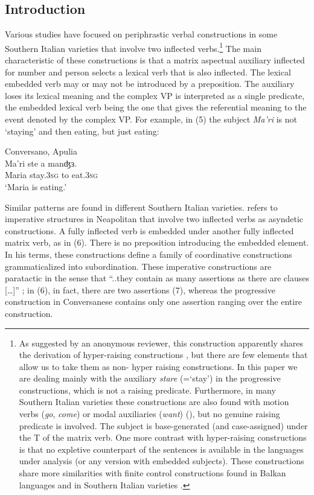 \documentclass[output=paper]{langsci/langscibook}
\begin{document}
\subsection{Introduction}%

Various studies have focused on periphrastic verbal constructions in some Southern Italian varieties that involve two inflected verbs.\footnote{As suggested by an anonymous reviewer, this construction apparently shares the derivation of hyper-raising constructions \citep{Harford1985,Martins2005,Nunes2008,Zeller2006}, but there are few elements that allow us to take them as non- hyper raising constructions. In this paper we are dealing mainly with the auxiliary \textit{stare} (=‘stay’) in the progressive constructions, which is not a raising predicate. Furthermore, in many Southern Italian varieties these constructions are also found with motion verbs (\textit{go}, \textit{come}) or modal auxiliaries (\textit{want}) (\citealt{Manzini2005,Di2015,Manzini2017,CardinalettiND}), but no genuine raising predicate is involved. The subject is base-generated (and case-assigned) under the T of the matrix verb. One more contrast with hyper-raising constructions is that no expletive counterpart of the sentences is available in the languages under analysis (or any version with embedded subjects). These constructions share more similarities with finite control constructions found in Balkan languages \citep{Landau2004,Landau2013,Manzini2000} and in Southern Italian varieties \citep{Manzini2005,Ledgeway2015}.}  The main characteristic of these constructions is that a matrix aspectual auxiliary inflected for number and person selects a lexical verb that is also inflected. The lexical embedded verb may or may not be introduced by a preposition. The auxiliary loses its lexical meaning and the complex VP is interpreted as a single predicate, the embedded lexical verb being the one that gives the referential meaning to the event denoted by the complex VP. For example, in (5) the subject \textit{Ma'ri} is not ‘staying’ and then eating, but just eating:

\ea%
         Conversano, Apulia\label{ex:lorusso:5}\\
    \gll Ma'ri  ste     a   manʤɜ.\\
         Maria  stay.\textsc{3sg}  to  eat.\textsc{3sg}\\
    \glt ‘Maria is eating.’
    \z          

Similar patterns are found in different Southern Italian varieties. \citet{Ledgeway1997} refers to imperative structures in Neapolitan that involve two inflected verbs as asyndetic constructions. A fully inflected verb is embedded under another fully inflected matrix verb, as in (6). There is no preposition introducing the embedded element. In his terms, these constructions define a family of coordinative constructions grammaticalized into subordination. These imperative constructions are paratactic in the sense that “..they contain as many assertions as there are clauses […]” \citep[231]{Ledgeway1997}; in (6), in fact, there are two assertions (7), whereas the progressive construction in Conversanese contains only one assertion ranging over the entire construction.
\end{document}
